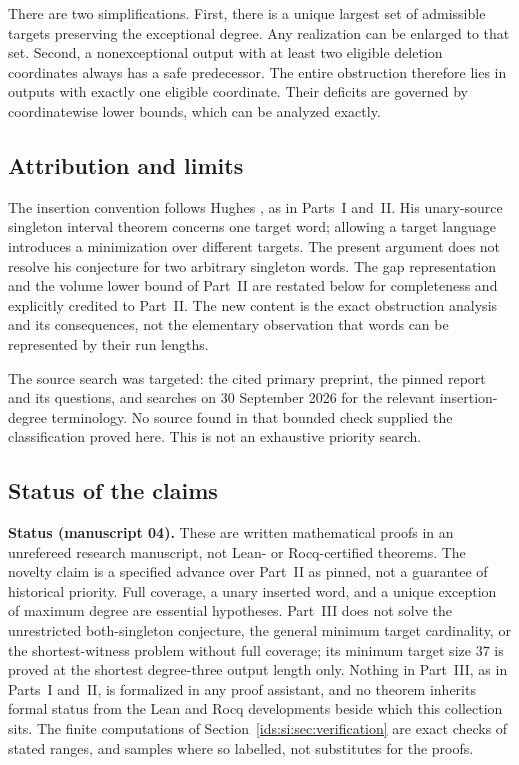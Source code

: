 \documentclass[11pt,letterpaper]{article}
\theoremstyle{definition}\newtheorem{definition}[theorem]{Definition}
\theoremstyle{remark}\newtheorem{remark}[theorem]{Remark}
\theoremstyle{definition}\newtheorem{question}[theorem]{Question}
\begin{document}
There are two simplifications. First, there is a unique largest set of
admissible targets preserving the exceptional degree. Any realization can be
enlarged to that set. Second, a nonexceptional output with at least two
eligible deletion coordinates always has a safe predecessor. The entire
obstruction therefore lies in outputs with exactly one eligible coordinate.
Their deficits are governed by coordinatewise lower bounds, which can be
analyzed exactly.

\subsection{Attribution and limits}\label{ids:si:sec:attribution}
The insertion convention follows Hughes \cite[Sections~2 and~11]{Hughes2026},
as in Parts~I and~II. His unary-source singleton interval theorem concerns one
target word; allowing a target language introduces a minimization over
different targets. The present argument does not resolve his conjecture for
two arbitrary singleton words. The gap representation and the volume lower
bound of Part~II are restated below for completeness and explicitly credited
to Part~II. The new content is the exact obstruction analysis and its
consequences, not the elementary observation that words can be represented by
their run lengths.

The source search was targeted: the cited primary preprint, the pinned report
and its questions, and searches on 30 September 2026 for the relevant
insertion-degree terminology. No source found in that bounded check supplied
the classification proved here. This is not an exhaustive priority search.

\subsection{Status of the claims}\label{ids:si:sec:status}

\noindent\textbf{Status (manuscript 04).} These are written mathematical
proofs in an unrefereed research manuscript, not Lean- or Rocq-certified
theorems. The novelty claim is a specified advance over Part~II as pinned, not
a guarantee of historical priority. Full coverage, a unary inserted word, and
a unique exception of maximum degree are essential hypotheses. Part~III does
not solve the unrestricted both-singleton conjecture, the general minimum
target cardinality, or the shortest-witness problem without full coverage; its
minimum target size $37$ is proved at the shortest degree-three output length
only. Nothing in Part~III, as in Parts~I and~II, is formalized in any proof
assistant, and no theorem inherits formal status from the Lean and Rocq
developments beside which this collection sits. The finite computations of
Section~\ref{ids:si:sec:verification} are exact checks of stated ranges,
and samples where so labelled, not substitutes for the proofs.
\end{document}
